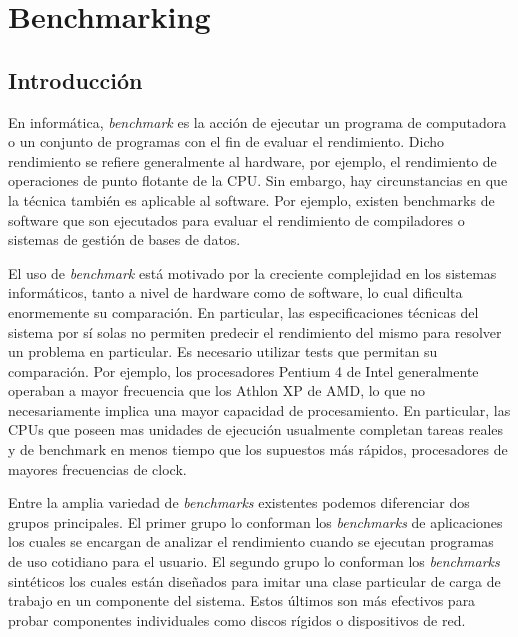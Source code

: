 \chapter{Benchmarking}

\section{Introducción}

En informática, \textit{benchmark} es la acción de ejecutar un
programa de computadora o un conjunto de programas con el fin de
evaluar el rendimiento. Dicho rendimiento se refiere generalmente al
hardware, por ejemplo, el rendimiento de operaciones de punto flotante
de la CPU. Sin embargo, hay circunstancias en que la técnica también
es aplicable al software. Por ejemplo, existen benchmarks de software
que son ejecutados para evaluar el rendimiento de compiladores o
sistemas de gestión de bases de datos.

El uso de \textit{benchmark} está motivado por la creciente
complejidad en los sistemas informáticos, tanto a nivel de hardware
como de software, lo cual dificulta enormemente su comparación. En
particular, las especificaciones técnicas del sistema por sí solas no
permiten predecir el rendimiento del mismo para resolver un problema
en particular. Es necesario utilizar tests que permitan su
comparación. Por ejemplo, los procesadores Pentium 4 de Intel
generalmente operaban a mayor frecuencia que los Athlon XP de AMD, lo
que no necesariamente implica una mayor capacidad de procesamiento. En
particular, las CPUs que poseen mas unidades de ejecución usualmente
completan tareas reales y de benchmark en menos tiempo que los
supuestos más rápidos, procesadores de mayores frecuencias de clock.

Entre la amplia variedad de \textit{benchmarks} existentes podemos
diferenciar dos grupos principales. El primer grupo lo conforman los
\textit{benchmarks} de aplicaciones los cuales se encargan de analizar
el rendimiento cuando se ejecutan programas de uso cotidiano para el
usuario. El segundo grupo lo conforman los \textit{benchmarks}
sintéticos los cuales están diseñados para imitar una clase particular
de carga de trabajo en un componente del sistema. Estos últimos son
más efectivos para probar componentes individuales como discos rígidos
o dispositivos de red.
	
